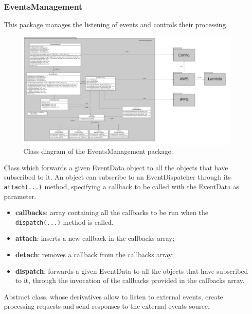 	\subsubsection{EventsManagement}
	This package manages the listening of events and controls their processing.
	\begin{figure} [h!]
		\centering
		\includegraphics[width=1.1\linewidth]{diagrammi/etherless-server/Eventsmanager}
		\caption{Class diagram of the EventsManagement package.}
	\end{figure}
	Class which forwards a given EventData object to all the objects that have subscribed to it. An object can subscribe to an EventDispatcher through its \texttt{attach(...)} method, specifying a callback to be called with the EventData as parameter.
	\begin{itemize}
		\item \textbf{callbacks}: array containing all the callbacks to be run when the \texttt{dispatch(...)} method is called.
	\end{itemize}
	\begin{itemize}
		\item \textbf{attach}: inserts a new callback in the callbacks array;
		\item \textbf{detach}: removes a callback from the callbacks array;
		\item \textbf{dispatch}: forwards a given EventData to all the objects that have subscribed to it, through the invocation of the callbacks provided in the callbacks array.
	\end{itemize}
	Abstract class, whose derivatives allow to listen to external events, create processing requests and send responses to the external events source.
